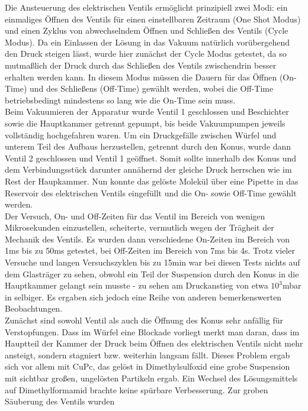 Die Ansteuerung des elektrischen Ventils ermöglicht
prinzipiell zwei Modi: ein einmaliges Öffnen des
Ventils für einen einstellbaren Zeitraum (One
Shot Modus) und einen Zyklus von abwechselndem
Öffnen und Schließen des Ventils (Cycle Modus).
Da ein Einlassen der Lösung in das Vakuum
natürlich vorübergehend den Druck steigen lässt, wurde hier
zunächst der Cycle Modus getestet, da so
mutmaßlich der Druck durch das Schließen des
Ventils zwischendrin besser erhalten werden
kann. In diesem Modus müssen die Dauern für das
Öffnen (On-Time) und des Schließens (Off-Time)
gewählt werden, wobei die Off-Time
betriebsbedingt mindestens so lang wie die
On-Time sein muss.\\
Beim Vakuumieren der Apparatur wurde Ventil 1
 geschlossen und Beschichter sowie die 
 Hauptkammer getrennt gepumpt, bis beide
 Vakuumpumpen jeweils vollständig hochgefahren
 waren.
 Um ein Druckgefälle zwischen Würfel und unterem
 Teil des Aufbaus herzustellen, getrennt durch den
 Konus, wurde dann Ventil 2 geschlossen und
 Ventil 1 geöffnet.
 Somit sollte innerhalb des Konus und dem
 Verbindungsstück darunter annähernd der gleiche
 Druck herrschen wie im Rest der Haupkammer.
 Nun konnte das gelöste Molekül über eine Pipette
 in das Reservoir des elektrischen Ventils
 eingefüllt und die On- sowie Off-Time gewählt
 werden.\\
 Der Versuch, On- und Off-Zeiten für das Ventil im
Bereich von wenigen Mikrosekunden einzustellen,
scheiterte, vermutlich wegen der Trägheit der Mechanik des
Ventils. Es wurden dann verschiedene On-Zeiten im Bereich von 1ms bis zu 50ms getestet, bei
Off-Zeiten im Bereich von 7ms bis 4s. Trotz vieler Versuche und langen Versuchszyklen bis zu 15min
war bei diesen Tests nichts auf dem Glasträger zu sehen, obwohl ein Teil der Suspension durch den
Konus in die Hauptkammer gelangt sein musste - zu sehen am Druckanstieg von etwa $10^{3}$mbar in
selbiger. Es ergaben sich jedoch eine Reihe von anderen bemerkenswerten Beobachtungen.\\
Zunächst sind sowohl Ventil als auch die Öffnung des Konus sehr anfällig für Verstopfungen. Dass im
Würfel eine Blockade vorliegt merkt man daran, dass im Hauptteil der Kammer der
Druck beim Öffnen des elektrischen Ventils nicht mehr ansteigt, sondern stagniert bzw. weiterhin
langsam fällt. Dieses Problem ergab sich vor allem mit CuPc, das gelöst in Dimethylsulfoxid eine
grobe Suspension mit sichtbar großen, ungelösten Partikeln ergab. Ein Wechsel des Lösungsmittels auf
Dimethylformamid brachte keine spürbare Verbesserung. Zur groben Säuberung des Ventils wurden
